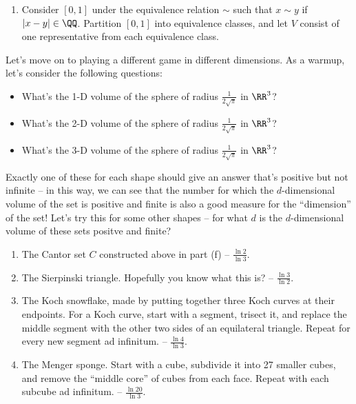 \documentclass[12pt]{article}
\begin{document}
\begin{enumerate}[label=(\alph*)]

  \item Consider $[0,1]$ under the equivalence relation $\sim$ such that $x \sim
    y$ if $|x - y| \in \QQ$. Partition $[0,1]$ into equivalence classes, and let
    $V$ consist of one representative from each equivalence class.

\end{enumerate}
Let's move on to playing a different game in different dimensions. As a warmup,
let's consider the following questions: 
\begin{center}
    \begin{itemize}
      \item What's the 1-D volume of the sphere of radius
        $\frac{1}{2\sqrt \pi}$ in $\RR^3$?
      \item What's the 2-D volume of the sphere of radius
        $\frac{1}{2\sqrt \pi}$ in $\RR^3$?
      \item What's the 3-D volume of the sphere of radius
        $\frac{1}{2\sqrt \pi}$ in $\RR^3$?
    \end{itemize}
\end{center}
Exactly one of these for each shape should give an answer that's positive but
not infinite -- in this way, we can see that the number for which the
$d$-dimensional volume of the set is positive and finite is also a good measure
for the ``dimension'' of the set! Let's try this for some other shapes -- for
what $d$ is the $d$-dimensional volume of these sets positve and finite?  
\begin{enumerate}[label=(\roman*)]
  \item The Cantor set $C$ constructed above in part (f) -- $\frac{\ln 2}{\ln
    3}$.  
  \item The Sierpinski triangle. Hopefully you know what this is? -- $\frac{\ln
    3}{\ln 2}$.
  \item The Koch snowflake, made by putting together three Koch curves at
    their endpoints. For a Koch curve, start
    with a segment, trisect it, and replace the middle segment with the other
    two sides of an equilateral triangle. Repeat for every new segment ad
    infinitum. -- $\frac{\ln 4}{\ln 3}$.
  \item The Menger sponge. Start with a cube, subdivide it into 27 smaller
    cubes, and remove the ``middle core'' of cubes from each face. Repeat with each
    subcube ad infinitum. -- $\frac{\ln 20}{\ln 3}$. 
\end{enumerate}
\end{document}
